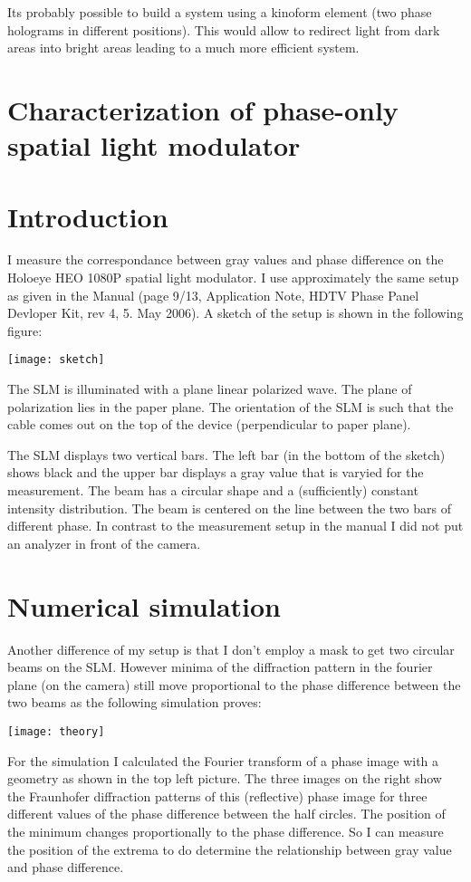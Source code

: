Its probably possible to build a system using a kinoform element (two
phase holograms in different positions). This would allow to redirect
light from dark areas into bright areas leading to a much more
efficient system.

\section{ Characterization of phase-only spatial light modulator}
\section{Introduction}
\label{sec-1}

I measure the correspondance between gray values and phase difference
on the Holoeye HEO 1080P spatial light modulator. I use approximately
the same setup as given in the Manual (page 9/13, Application Note,
HDTV Phase Panel Devloper Kit, rev 4, 5. May 2006). A sketch of the
setup is shown in the following figure:

\centerline{\texttt{[image: sketch]}}


The SLM is illuminated with a plane linear polarized wave. The plane
of polarization lies in the paper plane. The orientation of the SLM is
such that the cable comes out on the top of the device (perpendicular to
paper plane).

The SLM displays two vertical bars. The left bar (in the bottom of the
sketch) shows black and the upper bar displays a gray value that is
varyied for the measurement.
The beam has a circular shape and a (sufficiently) constant intensity
distribution. The beam is centered on the line between the two bars
of different phase.
In contrast to the measurement setup in the manual I did not put an
analyzer in front of the camera.

\section{Numerical simulation}
\label{sec-2}

Another difference of my setup is that I don't employ a mask to get
two circular beams on the SLM. However minima of the diffraction
pattern in the fourier plane (on the camera) still move proportional
to the phase difference between the two beams as the following
simulation proves:


\centerline{\texttt{[image: theory]}}


For the simulation I calculated the Fourier transform of a phase image
with a geometry as shown in the top left picture.  The three images on
the right show the Fraunhofer diffraction patterns of this
(reflective) phase image for three different values of the phase
difference between the half circles. The position of the minimum
changes proportionally to the phase difference. So I can measure the
position of the extrema to do determine the relationship between gray
value and phase difference.

